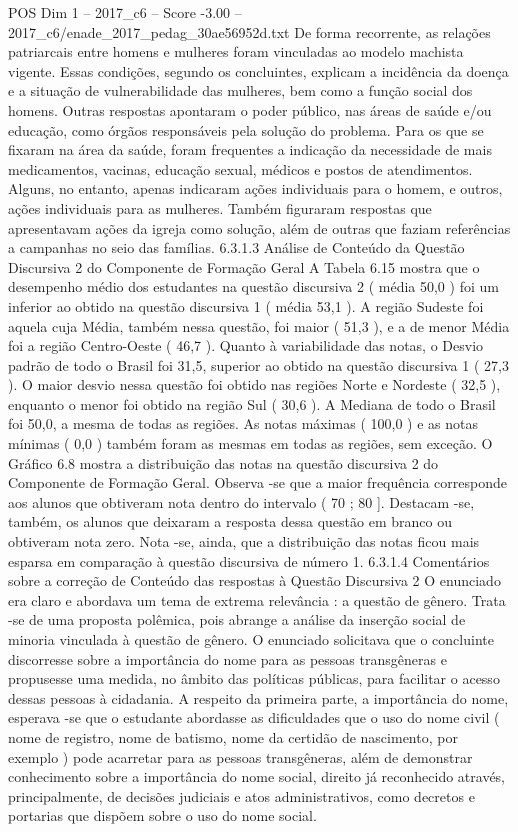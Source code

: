 \begin{textsample}{POS Dim 1 – 2017\_c6 – Score -3.00 – 2017\_c6/enade\_2017\_pedag\_30ae56952d.txt}
De forma recorrente, as relações patriarcais entre homens e mulheres foram vinculadas ao modelo machista vigente.
Essas condições, segundo os concluintes, explicam a incidência da doença e a situação de vulnerabilidade das mulheres, bem como a função social dos homens.
Outras respostas apontaram o poder público, nas áreas de saúde e/ou educação, como órgãos responsáveis pela solução do problema.
Para os que se fixaram na área da saúde, foram frequentes a indicação da necessidade de mais medicamentos, vacinas, educação sexual, médicos e postos de atendimentos.
Alguns, no entanto, apenas indicaram ações individuais para o homem, e outros, ações individuais para as mulheres.
Também figuraram respostas que apresentavam ações da igreja como solução, além de outras que faziam referências a campanhas no seio das famílias. 6.3.1.3 Análise de Conteúdo da Questão Discursiva 2 do Componente de Formação Geral A Tabela 6.15 mostra que o desempenho médio dos estudantes na questão discursiva 2 ( média 50,0 ) foi um inferior ao obtido na questão discursiva 1 ( média 53,1 ).
A região Sudeste foi aquela cuja Média, também nessa questão, foi maior ( 51,3 ), e a de menor Média foi a região Centro-Oeste ( 46,7 ).
Quanto à variabilidade das notas, o Desvio padrão de todo o Brasil foi 31,5, superior ao obtido na questão discursiva 1 ( 27,3 ).
O maior desvio nessa questão foi obtido nas regiões Norte e Nordeste ( 32,5 ), enquanto o menor foi obtido na região Sul ( 30,6 ).
A Mediana de todo o Brasil foi 50,0, a mesma de todas as regiões.
As notas máximas ( 100,0 ) e as notas mínimas ( 0,0 ) também foram as mesmas em todas as regiões, sem exceção.
O Gráfico 6.8 mostra a distribuição das notas na questão discursiva 2 do Componente de Formação Geral.
Observa -se que a maior frequência corresponde aos alunos que obtiveram nota dentro do intervalo ( 70 ; 80 ].
Destacam -se, também, os alunos que deixaram a resposta dessa questão em branco ou obtiveram nota zero.
Nota -se, ainda, que a distribuição das notas ficou mais esparsa em comparação à questão discursiva de número 1. 6.3.1.4 Comentários sobre a correção de Conteúdo das respostas à Questão Discursiva 2 O enunciado era claro e abordava um tema de extrema relevância : a questão de gênero.
Trata -se de uma proposta polêmica, pois abrange a análise da inserção social de minoria vinculada à questão de gênero.
O enunciado solicitava que o concluinte discorresse sobre a importância do nome para as pessoas transgêneras e propusesse uma medida, no âmbito das políticas públicas, para facilitar o acesso dessas pessoas à cidadania.
A respeito da primeira parte, a importância do nome, esperava -se que o estudante abordasse as dificuldades que o uso do nome civil ( nome de registro, nome de batismo, nome da certidão de nascimento, por exemplo ) pode acarretar para as pessoas transgêneras, além de demonstrar conhecimento sobre a importância do nome social, direito já reconhecido através, principalmente, de decisões judiciais e atos administrativos, como decretos e portarias que dispõem sobre o uso do nome social.

\end{textsample}
